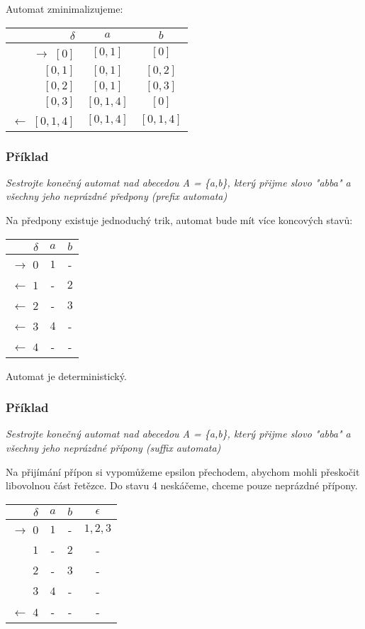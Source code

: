 \documentclass{article}
\begin{document}
Automat zminimalizujeme:

\begin{tabular}{|r||c|c|}
\hline
 $\delta$ &      $a$ &   $b$\\
\hline
\hline
$\rightarrow$ $[0]$ &   $[0,1]$ &       $[0]$\\
$[0,1]$ &       $[0,1]$ &       $[0,2]$\\
$[0,2]$ &       $[0,1]$ &       $[0,3]$\\
$[0,3]$ &       $[0,1,4]$ &     $[0]$\\
$\leftarrow$ $[0,1,4]$ &        $[0,1,4]$ &     $[0,1,4]$\\
\hline
\end{tabular}

\subsubsection{Příklad}
\label{prefix}
\emph{
Sestrojte konečný automat nad abecedou A = \{a,b\}, který přijme slovo "abba" a všechny jeho neprázdné předpony (prefix automata)
}

Na předpony existuje jednoduchý trik, automat bude mít více koncových stavů:

\begin{tabular}{|r||c|c|}
\hline
 $\delta$ &      $a$ &   $b$\\
\hline
\hline
$\rightarrow$ $0$ &     $1$ &   -\\
$\leftarrow$ $1$ &      - &     $2$\\
$\leftarrow$ $2$ &      - &     $3$\\
$\leftarrow$ $3$ &      $4$ &   -\\
$\leftarrow$ $4$ &      - &     -\\
\hline
\end{tabular}

Automat je deterministický.

\subsubsection{Příklad}
\emph{
Sestrojte konečný automat nad abecedou A = \{a,b\}, který přijme slovo "abba" a všechny jeho neprázdné přípony (suffix automata)
}

Na přijímání přípon si vypomůžeme epsilon přechodem, abychom mohli přeskočit libovolnou část řetězce. Do stavu 4 neskáčeme, chceme pouze neprázdné přípony.

\begin{tabular}{|r||c|c|c|}
\hline
 $\delta$ &      $a$ &   $b$ &   $\epsilon$\\
\hline
\hline
$\rightarrow$ $0$ &     $1$ &   - &     $1,2,3$\\
$1$ &   - &     $2$ &   -\\
$2$ &   - &     $3$ &   -\\
$3$ &   $4$ &   - &     -\\
$\leftarrow$ $4$ &      - &     - &     -\\
\hline
\end{tabular}
\end{document}
